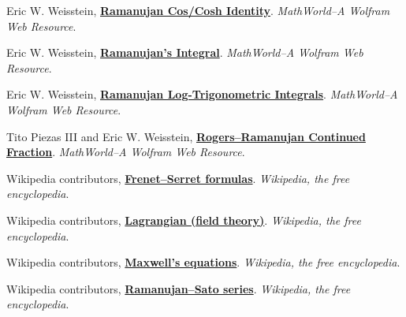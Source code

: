 \documentclass{article}
\begin{document}
\begin{thebibliography}{99}
    \newblock Eric W. Weisstein,
    \newblock \href{http://mathworld.wolfram.com/RamanujanCosCoshIdentity.html}%
                   {\textbf{Ramanujan Cos/Cosh Identity}}.
    \newblock \textit{MathWorld--A Wolfram Web Resource}.

    \newblock Eric W. Weisstein,
    \newblock \href{http://mathworld.wolfram.com/RamanujansIntegral.html}%
                   {\textbf{Ramanujan's Integral}}.
    \newblock \textit{MathWorld--A Wolfram Web Resource}.

    \newblock Eric W. Weisstein,
    \newblock \href{http://mathworld.wolfram.com/RamanujanLog-TrigonometricIntegrals.html}%
                   {\textbf{Ramanujan Log-Trigonometric Integrals}}.
    \newblock \textit{MathWorld--A Wolfram Web Resource}.

    \newblock Tito Piezas III and Eric W. Weisstein,
    \newblock \href{http://mathworld.wolfram.com/Rogers-RamanujanContinuedFraction.html}%
                   {\textbf{Rogers--Ramanujan Continued Fraction}}.
    \newblock \textit{MathWorld--A Wolfram Web Resource}.

    \newblock Wikipedia contributors,
    \newblock \href{https://en.wikipedia.org/wiki/Frenet%E2%80%93Serret_formulas}%
                   {\textbf{Frenet--Serret formulas}}.
    \newblock \textit{Wikipedia, the free encyclopedia}.

    \newblock Wikipedia contributors,
    \newblock \href{https://en.wikipedia.org/wiki/Lagrangian_(field_theory)}%
                   {\textbf{Lagrangian (field theory)}}.
    \newblock \textit{Wikipedia, the free encyclopedia}.

    \newblock Wikipedia contributors,
    \newblock \href{https://en.wikipedia.org/wiki/Maxwell%27s_equations}%
                   {\textbf{Maxwell's equations}}.
    \newblock \textit{Wikipedia, the free encyclopedia}.

    \newblock Wikipedia contributors,
    \newblock \href{https://en.wikipedia.org/wiki/Ramanujan%E2%80%93Sato_series}%
                   {\textbf{Ramanujan--Sato series}}.
    \newblock \textit{Wikipedia, the free encyclopedia}.


\end{thebibliography}
\end{document}
